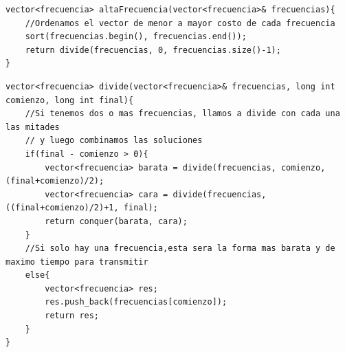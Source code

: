 	
		\begin{codesnippet}
	\begin{verbatim}
vector<frecuencia> altaFrecuencia(vector<frecuencia>& frecuencias){
    //Ordenamos el vector de menor a mayor costo de cada frecuencia
    sort(frecuencias.begin(), frecuencias.end());
    return divide(frecuencias, 0, frecuencias.size()-1);
}
	\end{verbatim}
	\end{codesnippet}

	
		\begin{codesnippet}
	\begin{verbatim}
vector<frecuencia> divide(vector<frecuencia>& frecuencias, long int comienzo, long int final){
    //Si tenemos dos o mas frecuencias, llamos a divide con cada una las mitades
    // y luego combinamos las soluciones
    if(final - comienzo > 0){
        vector<frecuencia> barata = divide(frecuencias, comienzo, (final+comienzo)/2);
        vector<frecuencia> cara = divide(frecuencias, ((final+comienzo)/2)+1, final);
        return conquer(barata, cara);
    }
    //Si solo hay una frecuencia,esta sera la forma mas barata y de maximo tiempo para transmitir
    else{
        vector<frecuencia> res;
        res.push_back(frecuencias[comienzo]);
        return res;
    }
}
	\end{verbatim}
	\end{codesnippet}
	

